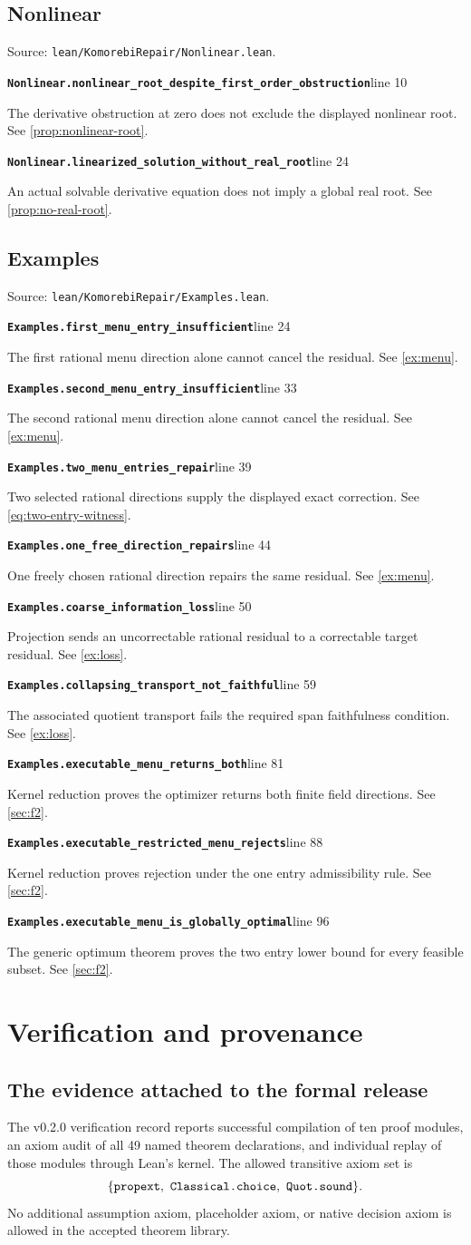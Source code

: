 \documentclass[11pt,letterpaper,oneside,openany]{book}
\theoremstyle{quiet}
\newcommand{\code}[1]{\texttt{\detokenize{#1}}}
\newcommand{\record}[3]{\noindent\begin{minipage}{\linewidth}\small\textbf{\nolinkurl{#1}}\hfill\textsf{line #2}\par\smallskip #3\end{minipage}\par\vspace{7pt}}
\newcommand{\moduleheading}[2]{\section{#1}\label{#2}\noindent\small Source: \nolinkurl{lean/KomorebiRepair/#1.lean}.\normalsize\par}
\begin{document}
\moduleheading{Nonlinear}{reg:Nonlinear}

\record{Nonlinear.nonlinear_root_despite_first_order_obstruction}{10}{The derivative obstruction at zero does not exclude the displayed nonlinear root. See \cref{prop:nonlinear-root}.}

\record{Nonlinear.linearized_solution_without_real_root}{24}{An actual solvable derivative equation does not imply a global real root. See \cref{prop:no-real-root}.}

\moduleheading{Examples}{reg:Examples}

\record{Examples.first_menu_entry_insufficient}{24}{The first rational menu direction alone cannot cancel the residual. See \cref{ex:menu}.}

\record{Examples.second_menu_entry_insufficient}{33}{The second rational menu direction alone cannot cancel the residual. See \cref{ex:menu}.}

\record{Examples.two_menu_entries_repair}{39}{Two selected rational directions supply the displayed exact correction. See \cref{eq:two-entry-witness}.}

\record{Examples.one_free_direction_repairs}{44}{One freely chosen rational direction repairs the same residual. See \cref{ex:menu}.}

\record{Examples.coarse_information_loss}{50}{Projection sends an uncorrectable rational residual to a correctable target residual. See \cref{ex:loss}.}

\record{Examples.collapsing_transport_not_faithful}{59}{The associated quotient transport fails the required span faithfulness condition. See \cref{ex:loss}.}

\record{Examples.executable_menu_returns_both}{81}{Kernel reduction proves the optimizer returns both finite field directions. See \cref{sec:f2}.}

\record{Examples.executable_restricted_menu_rejects}{88}{Kernel reduction proves rejection under the one entry admissibility rule. See \cref{sec:f2}.}

\record{Examples.executable_menu_is_globally_optimal}{96}{The generic optimum theorem proves the two entry lower bound for every feasible subset. See \cref{sec:f2}.}

\chapter{Verification and provenance}\label{app:evidence}
\section{The evidence attached to the formal release}
The v0.2.0 verification record reports successful compilation of ten proof modules, an axiom audit of all 49 named theorem declarations, and individual replay of those modules through Lean's kernel. The allowed transitive axiom set is
\[
\{\code{propext},\ \code{Classical.choice},\ \code{Quot.sound}\}.
\]
No additional assumption axiom, placeholder axiom, or native decision axiom is allowed in the accepted theorem library.
\end{document}
